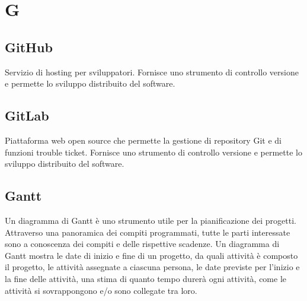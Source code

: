 \section*{G}
\markright{}
\subsection*{GitHub}
Servizio di hosting per sviluppatori. Fornisce uno strumento di controllo versione e permette lo sviluppo distribuito del software.
\subsection*{GitLab}
Piattaforma web open source che permette la gestione di repository Git e di funzioni trouble ticket. Fornisce uno strumento di controllo versione e permette lo sviluppo distribuito del software.

\subsection*{Gantt}
Un diagramma di Gantt è uno strumento utile per la pianificazione dei progetti. Attraverso una panoramica dei compiti programmati, tutte le parti interessate sono a conoscenza dei compiti e delle rispettive scadenze. Un diagramma di Gantt mostra le date di inizio e fine di un progetto, da quali attività è composto il progetto, le attività assegnate a ciascuna persona, le date previste per l'inizio e la fine delle attività, una stima di quanto tempo durerà ogni attività, come le attività si sovrappongono e/o sono collegate tra loro.

